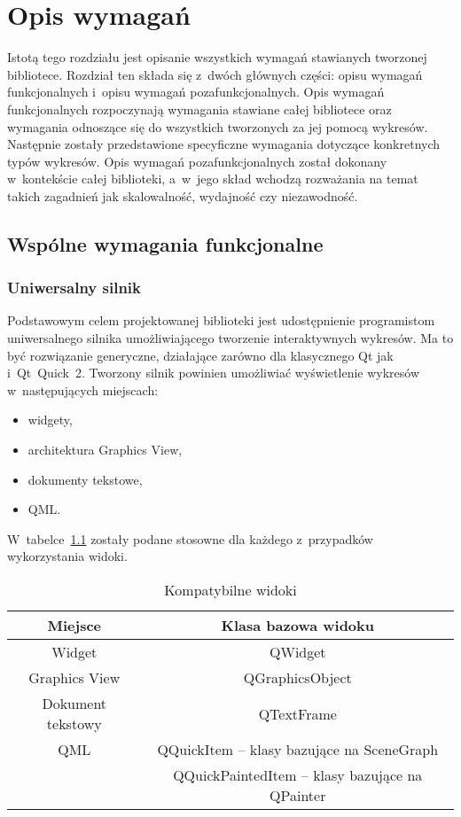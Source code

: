 \chapter{Opis wymagań}
Istotą tego rozdziału jest opisanie wszystkich wymagań stawianych tworzonej bibliotece. 
Rozdział ten składa się z~dwóch głównych części: opisu wymagań funkcjonalnych i~opisu wymagań pozafunkcjonalnych.\newline
Opis wymagań funkcjonalnych rozpoczynają wymagania stawiane całej bibliotece oraz wymagania odnoszące się do wszystkich tworzonych za jej pomocą wykresów. Następnie zostały przedstawione specyficzne wymagania dotyczące konkretnych typów wykresów.\newline
Opis wymagań pozafunkcjonalnych został dokonany w~kontekście całej biblioteki, a~w~jego skład wchodzą rozważania na temat takich zagadnień jak skalowalność, wydajność czy niezawodność.

\section{Wspólne wymagania funkcjonalne}
\subsection{Uniwersalny silnik}
Podstawowym celem projektowanej biblioteki jest udostępnienie programistom uniwersalnego silnika umożliwiającego tworzenie interaktywnych wykresów. Ma to być rozwiązanie generyczne, działające zarówno dla klasycznego Qt jak i~Qt~Quick~2. Tworzony silnik powinien umożliwiać wyświetlenie wykresów w~następujących miejscach:
\begin{itemize}
\item{widgety,}
\item{architektura Graphics View,}
\item{dokumenty tekstowe,}
\item{QML.}
\end{itemize}

W~tabelce~\ref{tab:widoki} zostały podane stosowne dla każdego z~przypadków wykorzystania widoki.

\begin{table}[h]\footnotesize
\centering
\caption{Kompatybilne widoki}
\label{tab:widoki}
\begin{tabular}{|c|c|}
\hline
Miejsce & Klasa bazowa widoku\\
\hline
Widget & QWidget\\
\hline
Graphics View & QGraphicsObject\\
\hline
Dokument tekstowy & QTextFrame\\
\hline
QML & QQuickItem -- klasy bazujące na SceneGraph\\
 & QQuickPaintedItem -- klasy bazujące na QPainter\\
\hline
\end{tabular}
\end{table}

